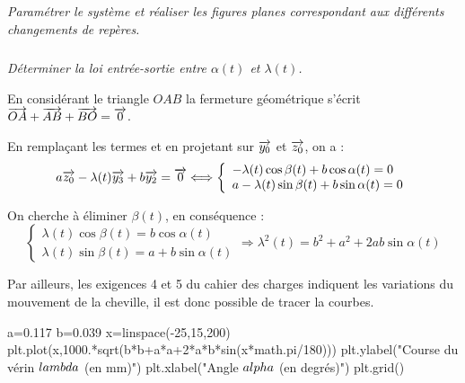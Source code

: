 \documentclass[10pt]{article}
\newif\ifprof
\begin{document}
\ifprof
\begin{corrige}
Les paramètres variables sont :
\begin{itemize}
\item l'angle $\alpha(t)$;
\item l'angle $\beta(t)$;
\item l'angle $\theta(t)$ (non représenté);
\item la distance $\lambda(t)$ représentative de l'élongation du vérin. 
\end{itemize}

L'actionneur étant ici le vérin 3, $\lambda(t)$ est l'entrée du système.  Dans le cas du système,  	$\theta(t)$ peut être considéré comme la sortie. 
\end{corrige}

\else
\fi

\subparagraph{}
\textit{Paramétrer le système et réaliser les figures planes correspondant aux différents changements de repères.} 

\ifprof
\begin{corrige}
\begin{center}
\end{center}
\end{corrige}
\else
\fi


\subparagraph{}
\textit{Déterminer la loi entrée-sortie entre $\alpha(t)$ et $\lambda(t)$.} 


\ifprof
\begin{corrige}
En considérant le triangle $OAB$ la fermeture géométrique s'écrit $\overrightarrow{OA}+\overrightarrow{AB}+\overrightarrow{BO}=\overrightarrow{0}$.

En remplaçant les termes et en projetant sur $\overrightarrow{y_0}$ et $\overrightarrow{z_0}$, on a :
$$
a\overrightarrow{z_{0}} - \lambda(t)\overrightarrow{y_3}+b\overrightarrow{y_2} = \overrightarrow{0} \Longleftrightarrow
\left\{
\begin{array}{l}
-\lambda(t)\cos \beta(t) +b\cos \alpha(t) = 0  \\
a -\lambda(t)\sin \beta(t) +b\sin \alpha(t) = 0
\end{array}
\right.
$$

On cherche à éliminer $\beta(t)$, en conséquence :
$$
\left\{
\begin{array}{l}
\lambda(t)\cos \beta(t)  = b\cos \alpha(t)  \\
\lambda(t)\sin \beta(t)  = a+ b\sin \alpha(t) 
\end{array}
\right.
\Longrightarrow
\lambda^2(t) = b^2 + a^2 + 2 a b \sin \alpha (t)
$$

Par ailleurs, les exigences 4 et 5 du cahier des charges indiquent les variations du mouvement de la cheville, il est donc possible de tracer la courbes.
\begin{py}
\begin{python}
a=0.117
b=0.039
x=linspace(-25,15,200)
plt.plot(x,1000.*sqrt(b*b+a*a+2*a*b*sin(x*math.pi/180)))
plt.ylabel("Course du vérin $\\lambda$ (en mm)")
plt.xlabel("Angle $\\alpha$ (en degrés)")
plt.grid()
\end{python}
\end{py}
\end{corrige}
\end{document}

